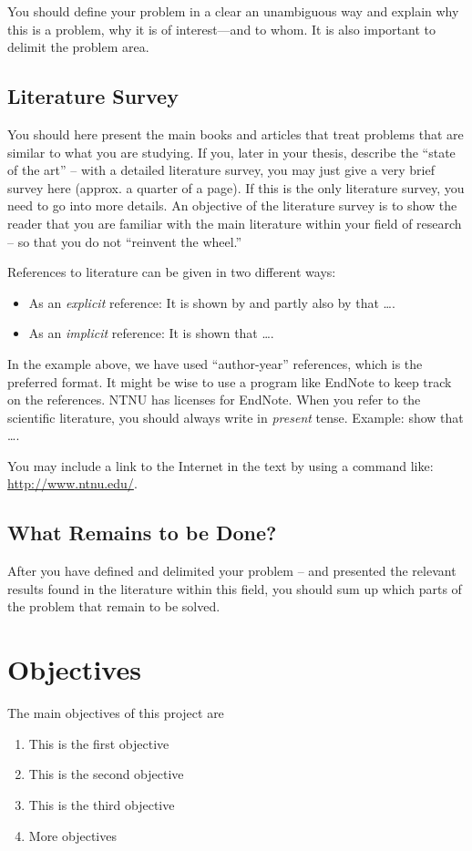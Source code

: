 You should define your problem in a clear an unambiguous way and explain why this is a problem, why it is of interest---and to whom. It is also important to delimit the problem area.
\subsection*{Literature Survey}
You should here present the main books and articles that treat problems that are similar to what  you are studying. If you,  later in your thesis, describe the ``state of the art'' -- with a detailed literature survey, you may just give a very brief survey here (approx. a quarter of a page). If this is the only literature survey, you need to go into more details. An objective of the literature survey is to show the reader that you are familiar with the main literature within your field of research -- so that you do not ``reinvent the wheel.''


References to literature can be given in two different ways:
\begin{itemize}
\item As an \emph{explicit} reference: It is shown by \citet{gri2010NUM} and partly also by \citet{Emd2007}  that \ldots.
\item As an \emph{implicit} reference: It is shown \citep[e.g., see][Chap. 4]{Deg2011Geo} that \ldots.
\end{itemize}
In the example above, we have used ``author-year'' references, which is the preferred format. It might be wise to use a program like EndNote to keep track on the references. NTNU has licenses for EndNote. When you refer to the scientific literature, you should always write in \emph{present} tense. Example: \citet{gri2010NUM} show that \ldots. 
\begin{remark}
 You may include a link to the Internet in the text by using a command like: \url{http://www.ntnu.edu/}.
\end{remark} 


\subsection*{What Remains to be Done?}
After you have defined and delimited your problem -- and presented the relevant results found in the literature within this field, you should sum up which parts of the problem that remain to be solved.
\section{Objectives}
The main objectives of this project are
\begin{enumerate}
\item This is the first objective
\item This is the second objective
\item This is the third objective
\item More objectives
\end{enumerate}

